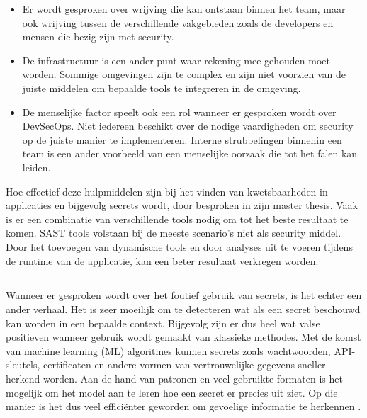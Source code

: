 \begin{itemize}
  \item Er wordt gesproken over wrijving die kan ontstaan binnen het team, maar ook wrijving tussen de verschillende vakgebieden zoals de developers en mensen die bezig zijn met security.
  \item De infrastructuur is een ander punt waar rekening mee gehouden moet worden. Sommige omgevingen zijn te complex en zijn niet voorzien van de juiste middelen om bepaalde tools te integreren in de omgeving.
  \item De menselijke factor speelt ook een rol wanneer er gesproken wordt over DevSecOps. Niet iedereen beschikt over de nodige vaardigheden om security op de juiste manier te implementeren. Interne strubbelingen binnenin een team is een ander voorbeeld van een menselijke oorzaak die tot het falen kan leiden.
\end{itemize}

Hoe effectief deze hulpmiddelen zijn bij het vinden van kwetsbaarheden in applicaties en bijgevolg secrets wordt, door \textcite{Thulin2015} besproken in zijn master thesis. Vaak is er een combinatie van verschillende tools nodig om tot het beste resultaat te komen. SAST tools volstaan bij de meeste scenario's niet als security middel. Door het toevoegen van dynamische tools en door analyses uit te voeren tijdens de runtime van de applicatie, kan een beter resultaat verkregen worden. 

\subsection{}
\label{sec:DevSecOps tools om secrets te herkennen en beheren}

Wanneer er gesproken wordt over het foutief gebruik van secrets, is het echter een ander verhaal. Het is zeer moeilijk om te detecteren wat als een secret beschouwd kan worden in een bepaalde context. Bijgevolg zijn er dus heel wat valse positieven wanneer gebruik wordt gemaakt van klassieke methodes. Met de komst van machine learning (ML) algoritmes kunnen secrets zoals wachtwoorden, API-sleutels, certificaten en andere vormen van vertrouwelijke gegevens sneller herkend worden. Aan de hand van patronen en veel gebruikte formaten is het mogelijk om het model aan te leren hoe een secret er precies uit ziet. Op die manier is het dus veel efficiënter geworden om gevoelige informatie te herkennen \autocite{Saha2020}.

